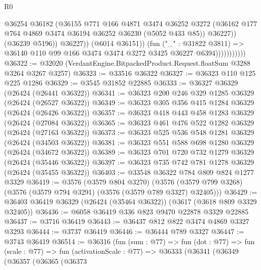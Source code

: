 \begin{lexlean}{R0}
\begin{coremodule}
                                  @36254
                                  @36182
                                  (@36155
                                    @771
                                    @166
                                    @4871
                                    @3474
                                    @36252
                                    @3272
                                    (@36162
                                      @177
                                      @764
                                      @4869
                                      @3474
                                      @36194
                                      @36252
                                      @36230
                                      (@5052 @433 @85))
                                    @36227))
                                (@36239 @5196))
                              @36227))
                          (@6014 @36151))
                        (fun ("_" : @31822 @3811) =>
                        @36140 @110 @99 @166 @3474 @3474 @3272 @3425 @36227 @6394)))))))))))
@36322 := @32020 (VerdantEngine.BitpackedProduct.Request.floatSum @3288 @3264 @3267 @3257)
@36323 := @33516 @36322
@36327 := @36323 @110 @125 @225 @1286
@36329 := @3545 @31852 @22885
@36333 := @36327 @36329 (@26424 (@26441 @36322))
@36341 := @36323 @200 @246 @329 @1285 @36329 (@26424 (@26527 @36322))
@36349 := @36323 @305 @356 @415 @1284 @36329 (@26424 (@26426 @36322))
@36357 := @36323 @418 @443 @458 @1283 @36329 (@26424 (@27084 @36322))
@36365 := @36323 @461 @476 @522 @1282 @36329 (@26424 (@27163 @36322))
@36373 := @36323 @525 @536 @548 @1281 @36329 (@26424 (@34503 @36322))
@36381 := @36323 @551 @588 @698 @1280 @36329 (@26424 (@34672 @36322))
@36389 := @36323 @701 @720 @732 @1279 @36329 (@26424 (@35446 @36322))
@36397 := @36323 @735 @742 @781 @1278 @36329 (@26424 (@35455 @36322))
@36403 := @33548 @36322 @784 @809 @824 @1277 @3329
@36419 := @3576
    (@3579 @804 @3270)
    (@3576 (@3579 @799 @3268) (@3576 (@3579 @794 @3291) (@3576 (@3579 @789 @3327) @32405)))
@36429 := @36403 @36419 @36329 (@26424 (@35464 @36322)) (@3617 (@3618 @809 @3329 @32405))
@36436 := @6058 @36419 @336 @823 @9470 @22878 @3329 @22885
@36437 := @3716 @36419
@36443 := @36437 @812 @822 @3474 @4869 @3327 @3293
@36444 := @3737 @36419
@36446 := @36444 @789 @3327
@36447 := @3743 @36419
@36514 := @36316
    (fun (sum : @77) =>
    fun (dot : @77) =>
    fun (scale : @77) =>
    fun (activationScale : @77) =>
    @36333
      (@36341
        (@36349
          (@36357
            (@36365
              (@36373

\end{coremodule}
\end{lexlean}
